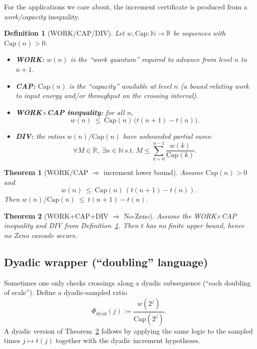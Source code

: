 \documentclass[11pt]{article}
\newcommand{\R}{\mathbb{R}}
\newcommand{\N}{\mathbb{N}}
\newtheorem{theorem}{Theorem}
\newtheorem{definition}{Definition}
\begin{document}
For the applications we care about, the increment certificate is produced from a
\emph{work/capacity} inequality.

\begin{definition}[WORK/CAP/DIV]\label{def:work-cap-div}
Let $w,\mathrm{Cap}:\N\to\R$ be sequences with $\mathrm{Cap}(n)>0$.
\begin{itemize}
\item \textbf{WORK:} $w(n)$ is the ``work quantum'' required to advance from level $n$ to $n+1$.
\item \textbf{CAP:} $\mathrm{Cap}(n)$ is the ``capacity'' available at level $n$ (a bound relating work
to input energy and/or throughput on the crossing interval).
\item \textbf{WORK$\times$CAP inequality:} for all $n$,
\[
w(n)\ \le\ \mathrm{Cap}(n)\,\bigl(t(n+1)-t(n)\bigr).
\]
\item \textbf{DIV:} the ratios $w(n)/\mathrm{Cap}(n)$ have unbounded partial sums:
\[
\forall M\in\R,\ \exists n\in\N\ \text{s.t.}\ M \le \sum_{k=0}^{n-1}\frac{w(k)}{\mathrm{Cap}(k)}.
\]
\end{itemize}
\end{definition}

\begin{theorem}[WORK/CAP $\Rightarrow$ increment lower bound]\label{thm:workcap-increment}
Assume $\mathrm{Cap}(n)>0$ and
\[
w(n)\ \le\ \mathrm{Cap}(n)\,(t(n+1)-t(n)).
\]
Then $w(n)/\mathrm{Cap}(n)\ \le\ t(n+1)-t(n)$.
\end{theorem}

\begin{theorem}[WORK+CAP+DIV $\Rightarrow$ No-Zeno]\label{thm:workcap-no-zeno}
Assume the WORK$\times$CAP inequality and DIV from Definition~\ref{def:work-cap-div}.
Then $t$ has no finite upper bound, hence no Zeno cascade occurs.
\end{theorem}

\subsection{Dyadic wrapper (``doubling'' language)}

Sometimes one only checks crossings along a dyadic subsequence (``each doubling of scale'').
Define a dyadic-sampled ratio
\[
\Phi_{\mathrm{dyad}}(j) := \frac{w(2^j)}{\mathrm{Cap}(2^j)}.
\]
A dyadic version of Theorem~\ref{thm:workcap-no-zeno} follows by applying the same logic to
the sampled times $j\mapsto t(j)$ together with the dyadic increment hypotheses.
\end{document}
